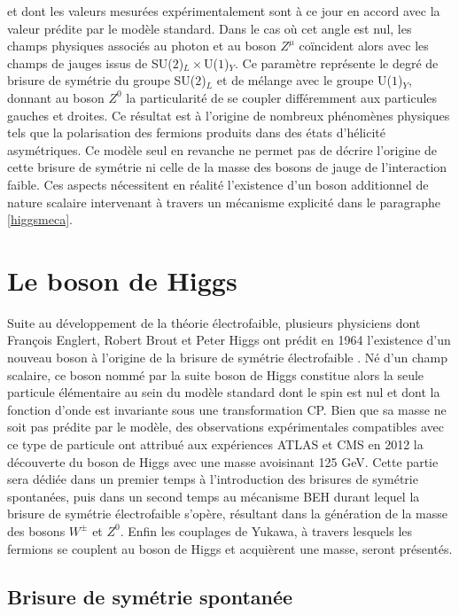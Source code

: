     et dont les valeurs mesurées expérimentalement sont à ce jour en accord avec la valeur prédite par le modèle standard. Dans le cas où cet angle est nul, les champs physiques associés au photon et au boson $Z^\mu$ coïncident alors avec les champs de jauges issus de SU($2$)$_L\times$U($1$)$_Y$. Ce paramètre représente le degré de brisure de symétrie du groupe SU($2$)$_L$ et de mélange avec le groupe U($1$)$_Y$, donnant au boson $Z^0$ la particularité de se coupler différemment aux particules gauches et droites. Ce résultat est à l'origine de nombreux phénomènes physiques tels que la polarisation des fermions produits dans des états d'hélicité asymétriques. Ce modèle seul en revanche ne permet pas de décrire l'origine de cette brisure de symétrie ni celle de la masse des bosons de jauge de l'interaction faible. Ces aspects nécessitent en réalité l'existence d'un boson additionnel de nature scalaire intervenant à travers un mécanisme explicité dans le paragraphe \ref{higgsmeca}.

    \section{Le boson de Higgs}

        Suite au développement de la théorie électrofaible, plusieurs physiciens dont François Englert, Robert Brout et Peter Higgs ont prédit en 1964 l'existence d'un nouveau boson à l'origine de la brisure de symétrie électrofaible \cite{BE,H}. Né d'un champ scalaire, ce boson nommé par la suite boson de Higgs constitue alors la seule particule élémentaire au sein du modèle standard dont le spin est nul et dont la fonction d'onde est invariante sous une transformation CP. Bien que sa masse ne soit pas prédite par le modèle, des observations expérimentales compatibles avec ce type de particule ont attribué aux expériences ATLAS et CMS en 2012 la découverte du boson de Higgs avec une masse avoisinant 125 GeV. Cette partie sera dédiée dans un premier temps à l'introduction des brisures de symétrie spontanées, puis dans un second temps au mécanisme BEH durant lequel la brisure de symétrie électrofaible s'opère, résultant dans la génération de la masse des bosons $W^{\pm}$ et $Z^0$. Enfin les couplages de Yukawa, à travers lesquels les fermions se couplent au boson de Higgs et acquièrent une masse, seront présentés.

        \subsection{Brisure de symétrie spontanée}

